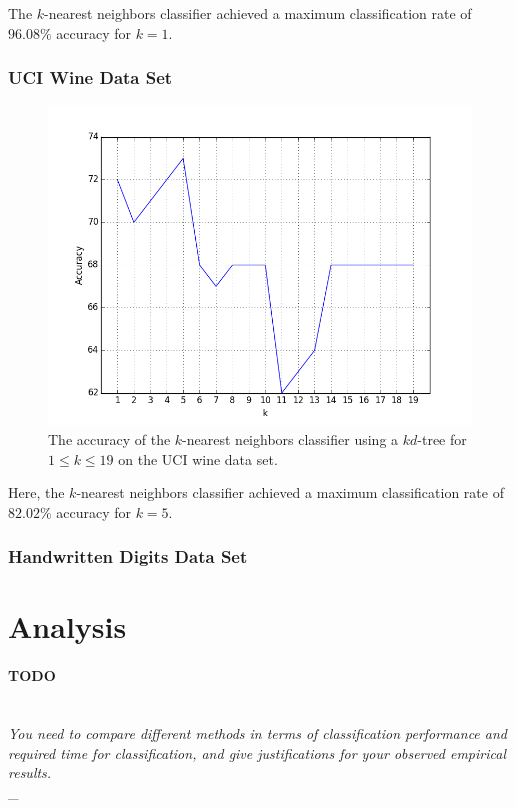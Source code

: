 \documentclass{article}
\numberwithin{figure}{section}
\newcommand{\outline}[2]{\paragraph{\textsc{#1}}\hrulefill~\\{\small\it #2}\\\_\hrulefill}
\newcommand{\todo}[1]{\outline{\large TODO}{#1}}
\begin{document}
The $k$-nearest neighbors classifier achieved a maximum classification rate of $96.08\%$ accuracy for $k=1$.

\subsubsection{UCI Wine Data Set}
\begin{figure}[H]
\centering
\includegraphics[width=.9\textwidth]{knn_kd_wine}
\caption{The accuracy of the $k$-nearest neighbors classifier using a $kd$-tree for $1 \leq k \leq 19$ on the UCI wine data set.}
\label{knn_wine}
\end{figure}

Here, the $k$-nearest neighbors classifier achieved a maximum classification rate of $82.02\%$ accuracy for $k=5$.

\subsubsection{Handwritten Digits Data Set}


\section{Analysis}
\todo{You need to compare different methods in terms of classification performance and required time for classification, and give justifications for your observed empirical results.}

\end{document}
